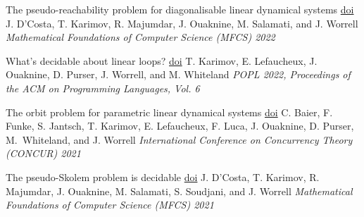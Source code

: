 \documentclass{article}
\begin{document}
\begin{etaremune}
		\item 
		{\large *The pseudo-reachability problem for diagonalisable linear dynamical systems}
		\quad
		\href{https://doi.org/10.4230/LIPIcs.MFCS.2022.40}{doi}
		\vspace{0.2cm}\newline
		J. D'Costa, T. Karimov, R. Majumdar, J. Ouaknine, M. Salamati, and J. Worrell
		\vspace*{0.25cm}\newline\emph{Mathematical Foundations of Computer Science (MFCS) 2022}%
		\vspace*{0.2cm}
		
		\item 
		{\large *What's decidable about linear loops?}
		\quad
		\href{https://doi.org/10.1145/3498727}{doi}
		\vspace{0.2cm}\newline
		T. Karimov, E. Lefaucheux, J. Ouaknine, D. Purser, J. Worrell, and M. Whiteland
		\vspace*{0.25cm}\newline
		\emph{POPL 2022, Proceedings of the ACM on Programming Languages, Vol. 6}
		\vspace*{0.2cm}
		
		\item 
		{\large The orbit problem for parametric linear dynamical systems}
		\quad
		\href{https://doi.org/10.4230/LIPIcs.CONCUR.2021.28}{doi}
		\vspace{0.2cm}\newline
		C. Baier, F. Funke, S. Jantsch, T. Karimov, E. Lefaucheux, F. Luca, J. Ouaknine, D. Purser, M.~Whiteland, and J. Worrell
		\vspace*{0.25cm}\newline \emph{International Conference on Concurrency Theory (CONCUR) 2021}
		\vspace*{0.2cm}
		
		\item 
		{\large *The pseudo-Skolem problem is decidable}
		\quad
		\href{https://doi.org/10.4230/LIPIcs.MFCS.2021.34}{doi}
		\vspace{0.2cm}\newline
		J. D'Costa, T. Karimov, R. Majumdar, J. Ouaknine, M. Salamati, S. Soudjani, and J. Worrell%
		\vspace*{0.25cm}\newline 
		\emph{Mathematical Foundations of Computer Science (MFCS) 2021}%
		\vspace*{0.2cm}
		

\end{etaremune}
\end{document}
